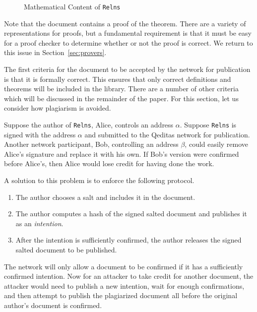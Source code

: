 \documentclass{article}
\begin{document}
\begin{figure}
\begin{center}
\end{center}
\caption{Mathematical Content of {\tt{Relns}}}
\label{fig:docrelns}
\end{figure}

Note that the document contains a proof of the theorem. There are a variety
of representations for proofs, but a fundamental requirement is that
it must be easy for a proof checker to determine whether or not the proof is correct.
We return to this issue in Section~\ref{sec:provers}.

The first criteria for the document to be accepted by the network for publication
is that it is formally correct. This ensures that only correct definitions and
theorems will be included in the library.
There are a number of other criteria which will be discussed in the remainder of the paper.
For this section, let us consider how plagiarism is avoided.

Suppose the author of {\tt{Relns}}, Alice, controls an address $\alpha$.
Suppose {\tt{Relns}} is signed with the address $\alpha$
and submitted to the Qeditas network for publication.
Another network participant, Bob, controlling an address $\beta$,
could easily remove Alice's signature and replace it with his own.
If Bob's version were confirmed before Alice's, then
Alice would lose credit for having done the work.

A solution to this problem is to enforce the following protocol.
\begin{enumerate}
\item The author chooses a salt and includes it in the document.
\item The author computes a hash of the signed salted document and publishes it as an {\em{intention}}.
\item After the intention is sufficiently confirmed, the author releases the signed salted document to be published.
\end{enumerate}
The network will only allow a document to be confirmed if it has a sufficiently confirmed intention.
Now for an attacker to take credit for another document, the attacker would
need to publish a new intention, wait for enough confirmations, and then
attempt to publish the plagiarized document all before the original author's document is
confirmed.
\end{document}
